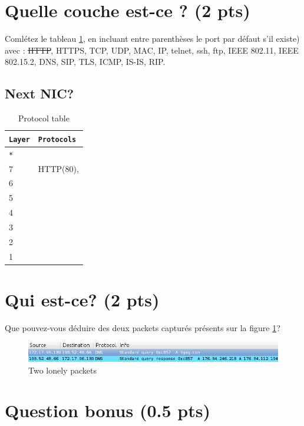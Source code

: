 \documentclass[11pt]{article}
\begin{document}
\pagebreak
\section{Quelle couche est-ce ? (2 pts)}
	Comlétez le tableau \ref{tab:protocol}, en incluant entre parenthèses le port par défaut s'il existe) avec : \sout{HTTP}, HTTPS, TCP, UDP, MAC, IP, telnet, ssh, ftp, IEEE 802.11, IEEE 802.15.2, DNS, SIP, TLS, ICMP, IS-IS, RIP.
	\subsection{Next NIC?}
		\renewcommand{\arraystretch}{1.5}
			\begin{table}[h]
			      \begin{tabular}{l|l}
			      		\verb+Layer+	&	\verb+Protocols+	\\ \hline
						\verb+*+		&	\\
			      		7				&	HTTP(80),			\\
			      		6				&	\\
			      		5				&	\\
			      		4				&	\\
			      		3				&	\\
			      		2				&	\\
			      		1				&	\\
			      \end{tabular}
			      \caption{Protocol table}
			  \label{tab:protocol}
			\end{table}
		\renewcommand{\arraystretch}{1.0}

	\section{Qui est-ce? (2 pts)}
		Que pouvez-vous déduire des deux packets capturés présents sur la figure \ref{fig:dns}?
		\begin{figure}[h]
			\begin{center}
				\includegraphics[width=18cm]{dns.png}
				\caption{Two lonely packets}
				\label{fig:dns}
			\end{center}
		\end{figure}
		\vspace{1cm}

\section{Question bonus (0.5 pts)}
\end{document}
